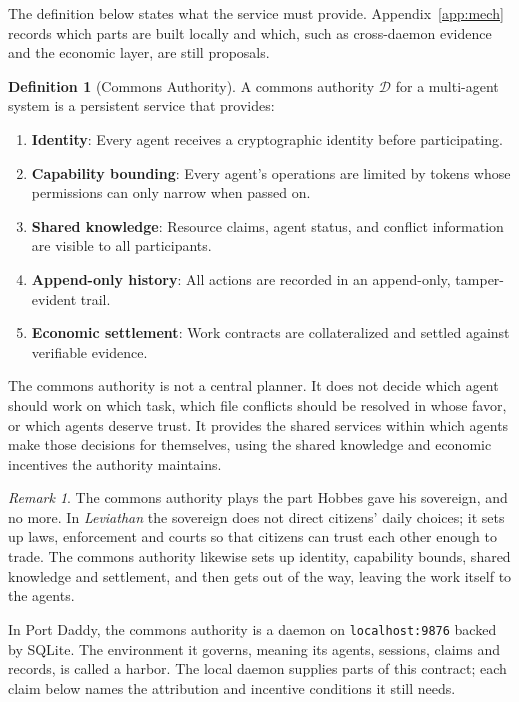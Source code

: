 \documentclass[11pt,a4paper]{article}
\theoremstyle{definition}
\newtheorem{definition}{Definition}[section]
\theoremstyle{remark}
\newtheorem*{remark}{Remark}
\begin{document}
The definition below states what the service must provide.
Appendix~\ref{app:mech} records which parts are built locally and which,
such as cross-daemon evidence and the economic layer, are still proposals.
\begin{definition}[Commons Authority]\label{def:commons}
\setlength{\parskip}{4pt plus 1pt}
A commons authority $\mathcal{D}$ for a multi-agent system is a persistent service that provides:
\begin{enumerate}[nosep]
  \item \textbf{Identity}: Every agent receives a cryptographic identity before participating.
\item \textbf{Capability bounding}: Every agent's operations are limited by tokens whose permissions can only narrow when passed on.
\item \textbf{Shared knowledge}: Resource claims, agent status, and conflict information are visible to all participants.
  \item \textbf{Append-only history}: All actions are recorded in an append-only, tamper-evident trail.
  \item \textbf{Economic settlement}: Work contracts are collateralized and settled against verifiable evidence.
\end{enumerate}
The commons authority is not a central planner. It does not decide which agent should work on which task, which file conflicts should be resolved in whose favor, or which agents deserve trust. It provides the shared services within which agents make those decisions for themselves, using the shared knowledge and economic incentives the authority maintains.
\end{definition}
\begin{remark}
The commons authority plays the part Hobbes gave his sovereign, and no more. In \emph{Leviathan} the sovereign does not direct citizens' daily choices; it sets up laws, enforcement and courts so that citizens can trust each other enough to trade. The commons authority likewise sets up identity, capability bounds, shared knowledge and settlement, and then gets out of the way, leaving the work itself to the agents.
\end{remark}
In Port Daddy, the commons authority is a daemon on \texttt{localhost:9876} backed by SQLite. The environment it governs, meaning its agents, sessions, claims and records, is called a harbor. The local daemon supplies parts of this contract; each claim below names
the attribution and incentive conditions it still needs.
\end{document}
